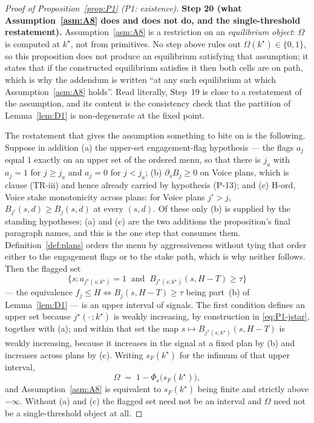 \begin{proof}[Proof of Proposition~\ref{prop:P1} (P1: existence)]
\smallskip
\noindent\textbf{Step 20 (what Assumption~\ref{asm:A8} does and does not do, and the single-threshold
restatement).}
Assumption~\ref{asm:A8} is a restriction on an \emph{equilibrium object}: $\Omega$ is computed at
$k^\star$, not from primitives. No step above rules out $\Omega(k^\star) \in \{0,1\}$, so this
proposition does not produce an equilibrium satisfying that assumption; it states that if the
constructed equilibrium satisfies it then both cells are on path, which is why the addendum is
written ``at any such equilibrium at which Assumption~\ref{asm:A8} holds''. Read literally, Step~19
is close to a restatement of the assumption, and its content is the consistency check that the
partition of Lemma~\ref{lem:D1} is non-degenerate at the fixed point.

The restatement that gives the assumption something to bite on is the following. Suppose in addition
(a) the upper-set engagement-flag hypothesis --- the flags $a_j$ equal $1$ exactly on an upper set of
the ordered menu, so that there is $j_a$ with $a_j = 1$ for $j \ge j_a$ and $a_j = 0$ for $j < j_a$;
(b) $\partial_s B_j \ge 0$ on Voice plans, which is clause (TR-iii) and hence already carried by
hypothesis (P-13); and (c) H-ord, Voice stake monotonicity across plans: for Voice plans $j' > j$,
$B_{j'}(s,d) \ge B_j(s,d)$ at every $(s,d)$. Of these only (b) is supplied by the standing
hypotheses; (a) and (c) are the two additions the proposition's final paragraph names, and this is
the one step that consumes them. Definition~\ref{def:plans} orders the menu by aggressiveness without
tying that order either to the engagement flags or to the stake path, which is why neither follows.
Then the flagged set
\[
\bigl\{s : a_{j^\star(s;k^\star)} = 1 \ \text{ and } \ B_{j^\star(s;k^\star)}(s,H-T) \ge \tau\bigr\}
\]
--- the equivalence $f_j \le H \iff B_j(s,H-T) \ge \tau$ being part~(b) of Lemma~\ref{lem:D1} --- is
an upper interval of signals. The first condition defines an upper set because
$j^\star(\cdot\,;k^\star)$ is weakly increasing, by construction in \eqref{eq:P1-jstar}, together with
(a); and within that set the map $s \mapsto B_{j^\star(s;k^\star)}(s,H-T)$ is weakly increasing,
because it increases in the signal at a fixed plan by (b) and increases across plans by (c). Writing
$s_F(k^\star)$ for the infimum of that upper interval,
\begin{equation}
\label{eq:P1-Omega}
\Omega \;=\; 1 - \Phi_s\bigl(s_F(k^\star)\bigr),
\end{equation}
and Assumption~\ref{asm:A8} is equivalent to $s_F(k^\star)$ being finite and strictly above
$-\infty$. Without (a) and (c) the flagged set need not be an interval and $\Omega$ need not be a
single-threshold object at all.


\end{proof}
